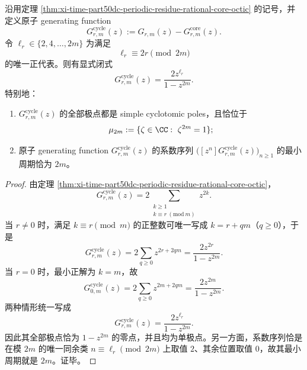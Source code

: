 \begin{corollary}\label{cor:xi-time-part50dc-atomic-periodic-residue-cyclotomic-shell}
沿用定理 \ref{thm:xi-time-part50dc-periodic-residue-rational-core-octic} 的记号，并定义原子 generating function
\[
G_{r,m}^{\mathrm{cycle}}(z):=G_{r,m}(z)-G_{r,m}^{\mathrm{core}}(z).
\]
令 \(\ell_r\in\{2,4,\dots,2m\}\) 为满足
\[
\ell_r\equiv 2r\pmod{2m}
\]
的唯一正代表。则有显式闭式
\[
\boxed{\;
G_{r,m}^{\mathrm{cycle}}(z)=\frac{2z^{\ell_r}}{1-z^{2m}}.\;}
\]
特别地：
\begin{enumerate}
  \item \(G_{r,m}^{\mathrm{cycle}}(z)\) 的全部极点都是 simple cyclotomic poles，且恰位于
  \[
  \mu_{2m}:=\{\zeta\in\CC:\ \zeta^{2m}=1\};
  \]
  \item 原子 generating function \(G_{r,m}^{\mathrm{cycle}}(z)\) 的系数序列 \(\bigl([z^n]G_{r,m}^{\mathrm{cycle}}(z)\bigr)_{n\ge 1}\) 的最小周期恰为 \(2m\)。
\end{enumerate}
\end{corollary}
\begin{proof}
由定理 \ref{thm:xi-time-part50dc-periodic-residue-rational-core-octic}，
\[
G_{r,m}^{\mathrm{cycle}}(z)
=
2\sum_{\substack{k\ge 1\\ k\equiv r\ (\mathrm{mod}\ m)}}z^{2k}.
\]
当 \(r\neq 0\) 时，满足 \(k\equiv r\pmod m\) 的正整数可唯一写成 \(k=r+qm\)（\(q\ge 0\)），于是
\[
G_{r,m}^{\mathrm{cycle}}(z)
=
2\sum_{q\ge 0}z^{2r+2qm}
=
\frac{2z^{2r}}{1-z^{2m}}.
\]
当 \(r=0\) 时，最小正解为 \(k=m\)，故
\[
G_{0,m}^{\mathrm{cycle}}(z)
=
2\sum_{q\ge 0}z^{2m+2qm}
=
\frac{2z^{2m}}{1-z^{2m}}.
\]
两种情形统一写成
\[
G_{r,m}^{\mathrm{cycle}}(z)=\frac{2z^{\ell_r}}{1-z^{2m}}.
\]
因此其全部极点恰为 \(1-z^{2m}\) 的零点，并且均为单极点。另一方面，系数序列恰是在模 \(2m\) 的唯一同余类 \(n\equiv \ell_r\pmod{2m}\) 上取值 \(2\)、其余位置取值 \(0\)，故其最小周期就是 \(2m\)。证毕。
\end{proof}


